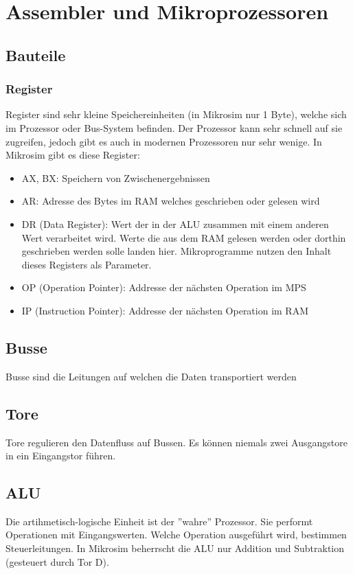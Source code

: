 \documentclass{article}
\begin{document}
\section*{Assembler und Mikroprozessoren}
\subsection*{Bauteile}
\subsubsection*{Register}
Register sind sehr kleine Speichereinheiten (in Mikrosim nur 1 Byte), welche sich im Prozessor oder Bus-System
befinden. Der Prozessor kann sehr schnell auf sie zugreifen, jedoch gibt es auch in modernen Prozessoren nur
sehr wenige. In Mikrosim gibt es diese Register:
\begin{itemize}
    \item AX, BX: Speichern von Zwischenergebnissen
    \item AR: Adresse des Bytes im RAM welches geschrieben oder gelesen wird
    \item DR (Data Register): Wert der in der ALU zusammen mit einem anderen Wert verarbeitet wird. Werte die aus dem RAM gelesen werden oder dorthin
    geschrieben werden solle landen hier. Mikroprogramme nutzen den Inhalt dieses Registers als Parameter.
    \item OP (Operation Pointer): Addresse der nächsten Operation im MPS
    \item IP (Instruction Pointer): Addresse der nächsten Operation im RAM
\end{itemize} 
\subsection*{Busse}
Busse sind die Leitungen auf welchen die Daten transportiert werden
\subsection*{Tore}
Tore regulieren den Datenfluss auf Bussen. Es können niemals zwei Ausgangstore in ein Eingangstor führen.
\subsection*{ALU}
Die artihmetisch-logische Einheit ist der ''wahre'' Prozessor. Sie performt Operationen mit Eingangswerten. Welche
Operation ausgeführt wird, bestimmen Steuerleitungen. In Mikrosim beherrscht die ALU nur Addition und Subtraktion
(gesteuert durch Tor D).
\end{document}
